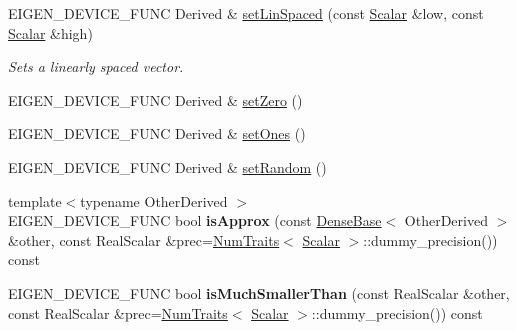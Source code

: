 \begin{DoxyCompactItemize}
E\+I\+G\+E\+N\+\_\+\+D\+E\+V\+I\+C\+E\+\_\+\+F\+U\+NC Derived \& \mbox{\hyperlink{class_eigen_1_1_dense_base_a99dd31774d69545aba5d4f598cd27c4b}{set\+Lin\+Spaced}} (const \mbox{\hyperlink{class_eigen_1_1_dense_base_a5feed465b3a8e60c47e73ecce83e39a2}{Scalar}} \&low, const \mbox{\hyperlink{class_eigen_1_1_dense_base_a5feed465b3a8e60c47e73ecce83e39a2}{Scalar}} \&high)
\begin{DoxyCompactList}\small\item\em Sets a linearly spaced vector. \end{DoxyCompactList}\item 
E\+I\+G\+E\+N\+\_\+\+D\+E\+V\+I\+C\+E\+\_\+\+F\+U\+NC Derived \& \mbox{\hyperlink{class_eigen_1_1_dense_base_ac74411ddeea2545bf20baf14613be47e}{set\+Zero}} ()
\item 
E\+I\+G\+E\+N\+\_\+\+D\+E\+V\+I\+C\+E\+\_\+\+F\+U\+NC Derived \& \mbox{\hyperlink{class_eigen_1_1_dense_base_ad18970fd7d9f9c3d8db9d05fa8652a25}{set\+Ones}} ()
\item 
E\+I\+G\+E\+N\+\_\+\+D\+E\+V\+I\+C\+E\+\_\+\+F\+U\+NC Derived \& \mbox{\hyperlink{class_eigen_1_1_dense_base_ac476e5852129ba32beaa1a8a3d7ee0db}{set\+Random}} ()
\item 
\mbox{\label{class_eigen_1_1_dense_base_af3793521d788a946cb9c5f4f92bab4d3}} 
{\footnotesize template$<$typename Other\+Derived $>$ }\\E\+I\+G\+E\+N\+\_\+\+D\+E\+V\+I\+C\+E\+\_\+\+F\+U\+NC bool {\bfseries is\+Approx} (const \mbox{\hyperlink{class_eigen_1_1_dense_base}{Dense\+Base}}$<$ Other\+Derived $>$ \&other, const Real\+Scalar \&prec=\mbox{\hyperlink{struct_eigen_1_1_num_traits}{Num\+Traits}}$<$ \mbox{\hyperlink{class_eigen_1_1_dense_base_a5feed465b3a8e60c47e73ecce83e39a2}{Scalar}} $>$\+::dummy\+\_\+precision()) const
\item 
\mbox{\label{class_eigen_1_1_dense_base_acc982903f94ed372fafa901e6822ae8d}} 
E\+I\+G\+E\+N\+\_\+\+D\+E\+V\+I\+C\+E\+\_\+\+F\+U\+NC bool {\bfseries is\+Much\+Smaller\+Than} (const Real\+Scalar \&other, const Real\+Scalar \&prec=\mbox{\hyperlink{struct_eigen_1_1_num_traits}{Num\+Traits}}$<$ \mbox{\hyperlink{class_eigen_1_1_dense_base_a5feed465b3a8e60c47e73ecce83e39a2}{Scalar}} $>$\+::dummy\+\_\+precision()) const
\item 
\mbox{\label{class_eigen_1_1_dense_base_a800a25f323fc4222c822be5fdad729ac}} 

\end{DoxyCompactItemize}

